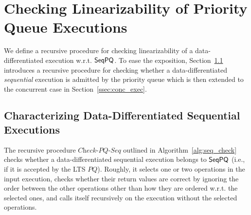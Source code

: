 \section{Checking Linearizability of Priority Queue Executions}
\label{sec:checking inclusion by recursive procedure}

We define a recursive procedure for checking linearizability of a data-differentiated execution w.r.t. $\mathsf{SeqPQ}$.
To ease the exposition, Section~\ref{ssec:seq_exec} introduces a recursive procedure for checking whether a data-differentiated \emph{sequential} execution is admitted by the priority queue which is then extended to the concurrent case in Section~\ref{ssec:conc_exec}.

\subsection{Characterizing Data-Differentiated Sequential Executions}\label{ssec:seq_exec}

The recursive procedure $\textit{Check-PQ-Seq}$ outlined in Algorithm~\ref{alg:seq_check} checks whether a data-differentiated sequential execution belongs to $\mathsf{SeqPQ}$ (i.e., if it is accepted by the LTS $PQ$).
 Roughly, it selects one or two operations in the input execution, checks whether their return values are correct by ignoring the order between the other operations other than how they are ordered w.r.t. the selected ones, and calls itself recursively on the execution without the selected operations.

